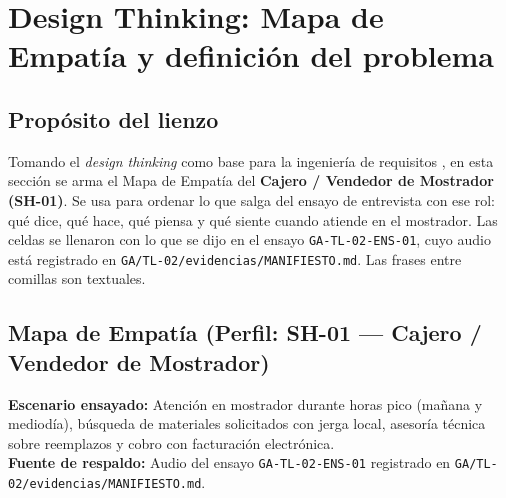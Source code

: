 \section{Design Thinking: Mapa de Empat\'ia y definici\'on del problema}

\subsection{Prop\'osito del lienzo}
Tomando el \emph{design thinking} como base para la ingenier\'ia de requisitos \cite{ireb2026}, en esta secci\'on se arma el Mapa de Empat\'ia del \textbf{Cajero / Vendedor de Mostrador (SH-01)}. Se usa para ordenar lo que salga del ensayo de entrevista con ese rol: qu\'e dice, qu\'e hace, qu\'e piensa y qu\'e siente cuando atiende en el mostrador. Las celdas se llenaron con lo que se dijo en el ensayo \texttt{GA-TL-02-ENS-01}, cuyo audio est\'a registrado en \texttt{GA/TL-02/evidencias/MANIFIESTO.md}. Las frases entre comillas son textuales.

\subsection{Mapa de Empat\'ia (Perfil: SH-01 --- Cajero / Vendedor de Mostrador)}

\begin{tcolorbox}[colback=boxbg,colframe=midblue,boxrule=0.8pt,arc=2mm,title={\textbf{Perfil analizado: Cajero / Vendedor de Mostrador (SH-01) --- Ferreter\'ia el\'ectrica en Quevedo}}]
\textbf{Escenario ensayado:} Atenci\'on en mostrador durante horas pico (ma\~nana y mediod\'ia), b\'usqueda de materiales solicitados con jerga local, asesor\'ia t\'ecnica sobre reemplazos y cobro con facturaci\'on electr\'onica.\\
\textbf{Fuente de respaldo:} Audio del ensayo \texttt{GA-TL-02-ENS-01} registrado en \texttt{GA/TL-02/evidencias/MANIFIESTO.md}.
\end{tcolorbox}


